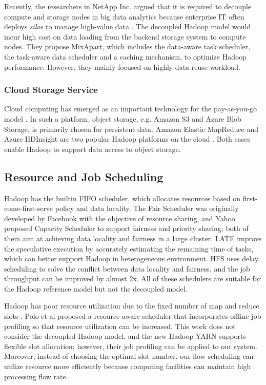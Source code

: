 Recently, the researchers in NetApp Inc. argued that it is required to decouple compute and storage nodes in big data analytics because enterprise IT often deploys \textit{silos} to manage high-value data \cite{MihailescuM2012_MixApart}.
The decoupled Hadoop model would incur high cost on data loading from the backend storage system to compute nodes.
They propose MixApart, which includes the data-aware task scheduler, the task-aware data scheduler and a caching mechanism, to optimize Hadoop performance.
However, they mainly focused on highly data-reuse workload.

\subsubsection{Cloud Storage Service}

Cloud computing has emerged as an important technology for the pay-as-you-go model \cite{ArmbrustM2010_CloudComputing, KarthikK2009_HadoopProvisioning}.
In such a platform, object storage, e.g. Amazon S3 and Azure Blob Storage, is primarily chosen for persistent data.
Amazon Elastic MapReduce and Azure HDInsight are two popular Hadoop platforms on the cloud \cite{AWS, WindowsAzure}.
Both cases enable Hadoop to support data access to object storage.

\subsection{Resource and Job Scheduling}

Hadoop has the builtin FIFO scheduler, which allocates resources based on first-come-first-serve policy and data locality.
The Fair Scheduler was originally developed by Facebook with the objective of resource sharing, and Yahoo proposed Capacity Scheduler to support fairness and priority sharing; both of them aim at achieving data locality and fairness in a large cluster.
LATE \cite{ZahariaM2008_LATE} improvs the speculative execution by accurately estimating the remaining time of tasks, which can better support Hadoop in heterogeneous environment.
HFS \cite{ZahariaM2010_DelayScheduling} uses delay scheduling to solve the conflict between data locality and fairness, and the job throughput can be improved by almost 2x.
All of these schedulers are suitable for the Hadoop reference model but not the decoupled model.

Hadoop has poor resource utilization due to the fixed number of map and reduce slots \cite{PoloJ2011_ResourceAware}.
Polo et al proposed a resource-aware scheduler that incorporates offline job profiling so that resource utilization  can be increased.
This work does not consider the decoupled Hadoop model, and the new Hadoop YARN supports flexible slot allocation; however, their job profiling can be applied to our system.
Moreover, instead of choosing the optimal slot number, our flow scheduling can utilize resource more efficiently because computing facilities can maintain high processing flow rate.

